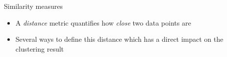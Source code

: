 \documentclass[pdf]{beamer}
\begin{document}
\normalsize
\begin{frame}{Similarity measures}
\begin{itemize}\addtolength{\itemsep}{0.5\baselineskip}
	\item A \textit{distance} metric quantifies how \textit{close} two data points are
	\item Several ways to define this distance which has a direct impact on the clustering result
\end{itemize}
\vfill
\begin{center}
\end{center}
\end{frame}
\end{document}
